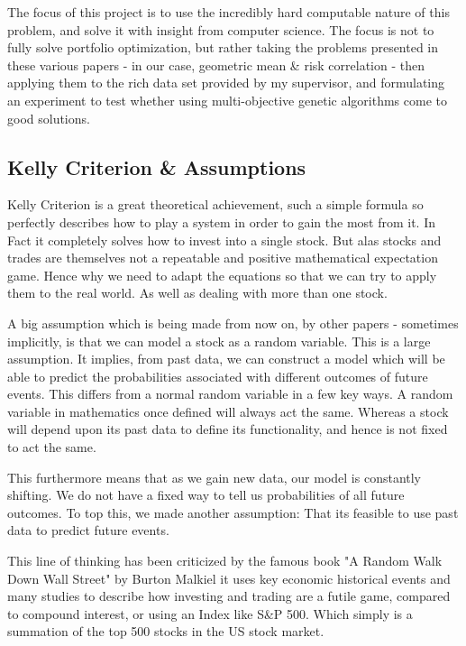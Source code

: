 \documentclass[11pt]{article}
\begin{document}
    The focus of this project is to use the incredibly hard computable nature
    of this problem, and solve it with insight from computer science. The focus
    is not to fully solve portfolio optimization, but rather taking the problems
    presented in these various papers - in our case, geometric mean \& risk
    correlation - then applying them to the rich data set provided
    by my supervisor, and formulating an experiment to test whether using
    multi-objective genetic algorithms come to good solutions.

\subsection{Kelly Criterion \& Assumptions}

    Kelly Criterion \cite{Kelly} is a great theoretical achievement, such a simple formula so
    perfectly describes how to play a system in order to gain the most from it. In Fact
    it completely solves how to invest into a single stock. But alas
    stocks and trades are themselves not a repeatable and positive mathematical expectation
    game. Hence why we need to adapt the equations so that we can try to apply them to the
    real world. As well as dealing with more than one stock.

    A big assumption which is being made from now on, by other papers - sometimes implicitly,
    is that we can model a stock as a random variable. This is a large assumption. It
    implies, from past data, we can construct a model which will be able
    to predict the probabilities associated with different outcomes of future events.
    This differs from a normal random variable in a few key ways. A random variable in
    mathematics once defined will always act the same. Whereas a stock will
    depend upon its past data to define its functionality, and hence is not fixed to act
    the same.

    This furthermore means that as we gain new data, our model is constantly shifting.
    We do not have a fixed way to tell us probabilities of all future outcomes.
    To top this, we made another assumption: That its feasible to use past data to predict
    future events.

    This line of thinking has been criticized by the famous book "A Random Walk Down
    Wall Street" by Burton Malkiel \cite{BurtonMalkiel} it uses
    key economic historical events and many studies to describe how investing and trading are
    a futile game, compared to compound interest, or using an Index like S\&P 500. Which
    simply is a summation of the top 500 stocks in the US stock market.
\end{document}
